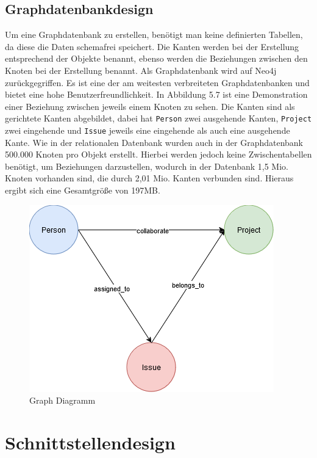 \subsection{Graphdatenbankdesign} %
\label{sec:graphsdatenbankdesign}
Um eine Graphdatenbank zu erstellen, benötigt man keine definierten Tabellen, da diese die Daten schemafrei speichert. Die Kanten werden bei der Erstellung entsprechend der Objekte benannt, ebenso werden die Beziehungen zwischen den Knoten bei der Erstellung benannt. Als Graphdatenbank wird auf Neo4j zurückgegriffen. Es ist eine der am weitesten verbreiteten Graphdatenbanken und bietet eine hohe Benutzerfreundlichkeit. In Abbildung 5.7 ist eine Demonstration einer Beziehung zwischen jeweils einem Knoten zu sehen. Die Kanten sind als gerichtete Kanten abgebildet, dabei hat \texttt{Person} zwei ausgehende Kanten, \texttt{Project} zwei eingehende und \texttt{Issue} jeweils eine eingehende als auch eine ausgehende Kante. Wie in der relationalen Datenbank wurden auch in der Graphdatenbank 500.000 Knoten pro Objekt erstellt. Hierbei werden jedoch keine Zwischentabellen benötigt, um Beziehungen darzustellen, wodurch in der Datenbank 1,5 Mio. Knoten vorhanden sind, die durch 2,01 Mio. Kanten verbunden sind. Hieraus ergibt sich eine Gesamtgröße von 197MB.


\begin{figure}[H]
	\centering
	\includegraphics[scale=.8]{Illustrations/graph_diagram}
	\caption{Graph Diagramm}
\end{figure}

\newpage
\section{Schnittstellendesign} %
\label{sec:schnittstellendesign}

